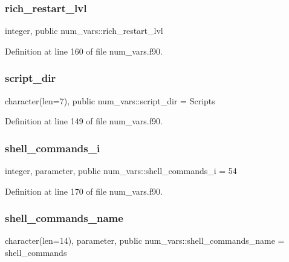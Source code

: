 \subsubsection{\texorpdfstring{rich\+\_\+restart\+\_\+lvl}{rich\_restart\_lvl}}
{\footnotesize\ttfamily integer, public num\+\_\+vars\+::rich\+\_\+restart\+\_\+lvl}



Definition at line 160 of file num\+\_\+vars.\+f90.

\mbox{\label{namespacenum__vars_a2b5f419579cb2d0ac2adda364be58fb5}} 
\subsubsection{\texorpdfstring{script\+\_\+dir}{script\_dir}}
{\footnotesize\ttfamily character(len=7), public num\+\_\+vars\+::script\+\_\+dir = \textquotesingle{}Scripts\textquotesingle{}}



Definition at line 149 of file num\+\_\+vars.\+f90.

\mbox{\label{namespacenum__vars_a2e139da75c6bcec4376b38d3ea1c5aa7}} 
\subsubsection{\texorpdfstring{shell\+\_\+commands\+\_\+i}{shell\_commands\_i}}
{\footnotesize\ttfamily integer, parameter, public num\+\_\+vars\+::shell\+\_\+commands\+\_\+i = 54}



Definition at line 170 of file num\+\_\+vars.\+f90.

\mbox{\label{namespacenum__vars_af30710083de41ebf93a407412d3125e5}} 
\subsubsection{\texorpdfstring{shell\+\_\+commands\+\_\+name}{shell\_commands\_name}}
{\footnotesize\ttfamily character(len=14), parameter, public num\+\_\+vars\+::shell\+\_\+commands\+\_\+name = \textquotesingle{}shell\+\_\+commands\textquotesingle{}}



